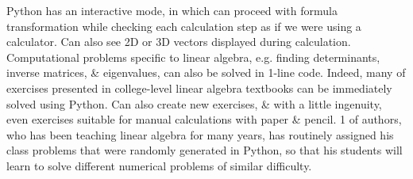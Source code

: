 \documentclass{article}
\begin{document}
\begin{itemize}
\begin{itemize}
		Python has an interactive mode, in which can proceed with formula transformation while checking each calculation step as if we were using a calculator. Can also see 2D or 3D vectors displayed during calculation. Computational problems specific to linear algebra, e.g. finding determinants, inverse matrices, \& eigenvalues, can also be solved in 1-line code. Indeed, many of exercises presented in college-level linear algebra textbooks can be immediately solved using Python. Can also create new exercises, \& with a little ingenuity, even exercises suitable for manual calculations with paper \& pencil. 1 of authors, who has been teaching linear algebra for many years, has routinely assigned his class problems that were randomly generated in Python, so that his students will learn to solve different numerical problems of similar difficulty.
		

\end{itemize}
\end{itemize}
\end{document}
